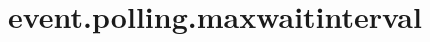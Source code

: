 \section{event.polling.maxwaitinterval}
\label{configuration:EventPollingMaxwaitinterval}
\AvailableInJavaAndCsharp{\TODO}